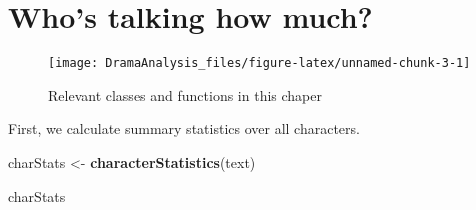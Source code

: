 \documentclass[]{book}
\newenvironment{Shaded}{\begin{snugshade}}{\end{snugshade}}
\newcommand{\KeywordTok}[1]{\textcolor[rgb]{0.13,0.29,0.53}{\textbf{#1}}}
\newcommand{\NormalTok}[1]{#1}
\newcommand{\StringTok}[1]{\textcolor[rgb]{0.31,0.60,0.02}{#1}}
\begin{document}
\hypertarget{who-how-much}{%
\chapter{Who's talking how much?}\label{who-how-much}}

\begin{figure}
\texttt{[image: DramaAnalysis\_files/figure-latex/unnamed-chunk-3-1]} \caption{Relevant classes and functions in this chaper}\label{fig:unnamed-chunk-3}
\end{figure}

First, we calculate summary statistics over all characters.

\begin{Shaded}
\begin{Highlighting}[]
\NormalTok{charStats <-}\StringTok{ }\KeywordTok{characterStatistics}\NormalTok{(text)}

\NormalTok{charStats}
\end{Highlighting}
\end{Shaded}
\end{document}

